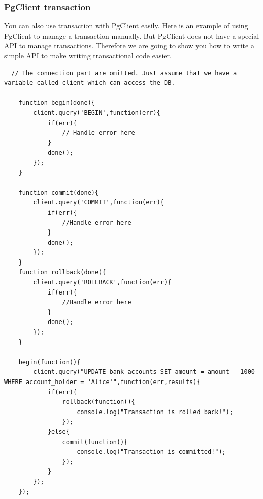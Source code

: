 \documentclass[a4paper]{article}
\begin{document}
\subsubsection{PgClient transaction}
You can also use transaction with PgClient easily. Here is an example of using PgClient to manage a transaction manually. But PgClient does not have a special API to manage transactions. Therefore we are going to show you how to write a simple API to make writing transactional code easier.
\begin{lstlisting}
  // The connection part are omitted. Just assume that we have a variable called client which can access the DB.

    function begin(done){
        client.query('BEGIN',function(err){
            if(err){
                // Handle error here
            }
            done();
        });
    }

    function commit(done){
        client.query('COMMIT',function(err){
            if(err){
                //Handle error here
            }
            done();
        });
    }
    function rollback(done){
        client.query('ROLLBACK',function(err){
            if(err){
                //Handle error here
            }
            done();
        });
    }

    begin(function(){
        client.query("UPDATE bank_accounts SET amount = amount - 1000 WHERE account_holder = 'Alice'",function(err,results){
            if(err){
                rollback(function(){
                    console.log("Transaction is rolled back!");
                });
            }else{
                commit(function(){
                    console.log("Transaction is committed!");
                });
            }
        });
    });
\end{lstlisting}
\end{document}
